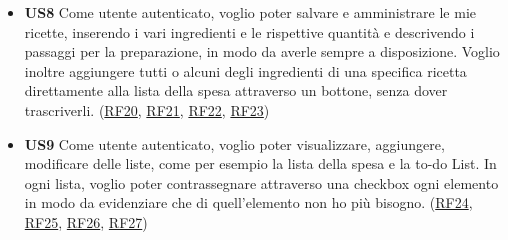 \documentclass[a4paper,12pt]{article}
\begin{document}
\begin{itemize}
\begin{center}
\end{center}

\item \textbf {US8}  Come utente autenticato, voglio poter salvare e amministrare le mie ricette, inserendo i vari ingredienti e le rispettive quantità e descrivendo i passaggi per la preparazione, in modo da averle sempre a disposizione. Voglio inoltre aggiungere tutti o alcuni degli ingredienti di una specifica ricetta direttamente alla lista della spesa attraverso un bottone, senza dover trascriverli. (\hyperlink{RF20}{RF20}, \hyperlink{RF21}{RF21}, \hyperlink{RF22}{RF22}, \hyperlink{RF23}{RF23})

\begin{center}
\end{center}

\item \textbf {US9}  Come utente autenticato, voglio poter visualizzare, aggiungere, modificare delle liste, come per esempio la lista della spesa e la to-do List. In ogni lista, voglio poter contrassegnare attraverso una checkbox ogni elemento in modo da evidenziare che di quell'elemento non ho più bisogno. (\hyperlink{RF24}{RF24}, \hyperlink{RF25}{RF25}, \hyperlink{RF26}{RF26}, \hyperlink{RF27}{RF27})

\begin{center}
\end{center}

\end{itemize}

\newpage
\end{document}
